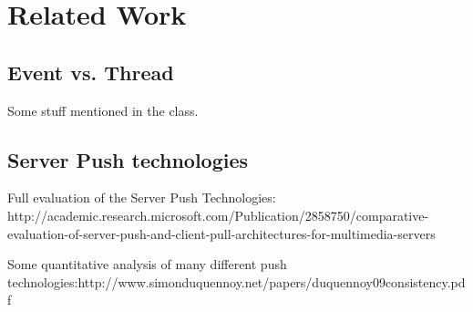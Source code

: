 \section{Related Work\\}

\subsection{Event vs. Thread\\}

Some stuff mentioned in the class.

\subsection{Server Push technologies\\}

Full evaluation of the Server Push Technologies: http://academic.research.microsoft.com/Publication/2858750/comparative-evaluation-of-server-push-and-client-pull-architectures-for-multimedia-servers

Some quantitative analysis of many different push technologies:http://www.simonduquennoy.net/papers/duquennoy09consistency.pdf

